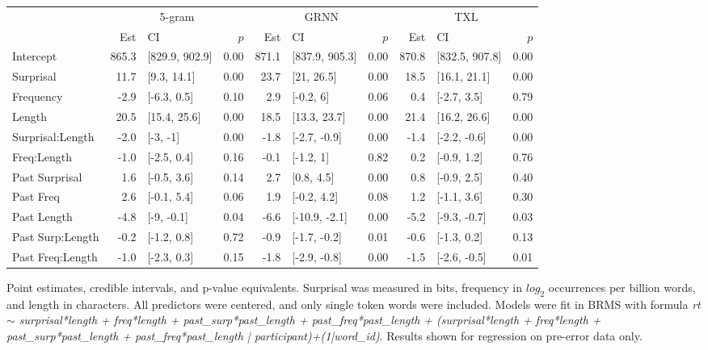 \documentclass[11pt,a4paper]{article}
\begin{document}
	\setlength{\tabcolsep}{3pt}
\begin{small}%
\begin{tabular}{l|rlr|rlr|rlr}
	\hline
	&\multicolumn{3}{c|}{5-gram}&\multicolumn{3}{c|}{GRNN}&\multicolumn{3}{c}{TXL}\\
		 & Est & CI & $p$ & Est & CI & $p$ &Est & CI & $p$ \\ 
		 \hline
Intercept & 865.3 & [829.9, 902.9] & 0.00 & 871.1 & [837.9, 905.3] & 0.00 & 870.8 & [832.5, 907.8] & 0.00 \\ 
Surprisal & 11.7 & [9.3, 14.1] & 0.00 & 23.7 & [21, 26.5] & 0.00 & 18.5 & [16.1, 21.1] & 0.00 \\ 
Frequency & -2.9 & [-6.3, 0.5] & 0.10 & 2.9 & [-0.2, 6] & 0.06 & 0.4 & [-2.7, 3.5] & 0.79 \\ 
		Length & 20.5 & [15.4, 25.6] & 0.00 & 18.5 & [13.3, 23.7] & 0.00 & 21.4 & [16.2, 26.6] & 0.00 \\ 
		Surprisal:Length & -2.0 & [-3, -1] & 0.00 & -1.8 & [-2.7, -0.9] & 0.00 & -1.4 & [-2.2, -0.6] & 0.00 \\
		Freq:Length & -1.0 & [-2.5, 0.4] & 0.16 & -0.1 & [-1.2, 1] & 0.82 & 0.2 & [-0.9, 1.2] & 0.76 \\ 
		\hline
			Past Surprisal & 1.6 & [-0.5, 3.6] & 0.14 & 2.7 & [0.8, 4.5] & 0.00 & 0.8 & [-0.9, 2.5] & 0.40 \\ 
		Past Freq & 2.6 & [-0.1, 5.4] & 0.06 & 1.9 & [-0.2, 4.2] & 0.08 & 1.2 & [-1.1, 3.6] & 0.30 \\ 
		Past Length & -4.8 & [-9, -0.1] & 0.04 & -6.6 & [-10.9, -2.1] & 0.00 & -5.2 & [-9.3, -0.7] & 0.03 \\ 
				Past Surp:Length & -0.2 & [-1.2, 0.8] & 0.72 & -0.9 & [-1.7, -0.2] & 0.01 & -0.6 & [-1.3, 0.2] & 0.13 \\ 
		Past Freq:Length & -1.0 & [-2.3, 0.3] & 0.15 & -1.8 & [-2.9, -0.8] & 0.00 & -1.5 & [-2.6, -0.5] & 0.01 \\ 
	


		 
\hline
\end{tabular}
\vspace{.1em}

\end{small}
		\begin{small}
			Point estimates, credible intervals, and p-value equivalents. Surprisal was measured in bits, frequency in $log_2$ occurrences per billion words, and length in characters. All predictors were centered, and only single token words were included. Models were fit in BRMS with formula \textit{rt $\sim$ surprisal*length + freq*length + past\_surp*past\_length + past\_freq*past\_length +
			(surprisal*length + freq*length + past\_surp*past\_length + past\_freq*past\_length | participant)+(1|word\_id)}. Results shown for regression on pre-error data only.
		\end{small}
\end{document}
